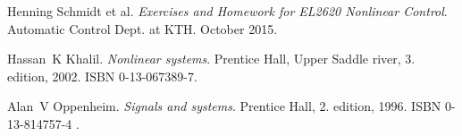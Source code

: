 
\begin{thebibliography}{99}
Henning Schmidt et al.
\newblock \emph{Exercises and Homework for EL2620 Nonlinear Control}.
\newblock Automatic Control Dept. at KTH. October 2015.

Hassan~K Khalil.
\newblock \emph{Nonlinear systems}.
\newblock Prentice Hall, Upper Saddle river, 3. edition, 2002.
\newblock ISBN 0-13-067389-7.

Alan~V Oppenheim.
\newblock \emph{Signals and systems}.
\newblock Prentice Hall, 2. edition, 1996.
\newblock ISBN 0-13-814757-4 .


\end{thebibliography}